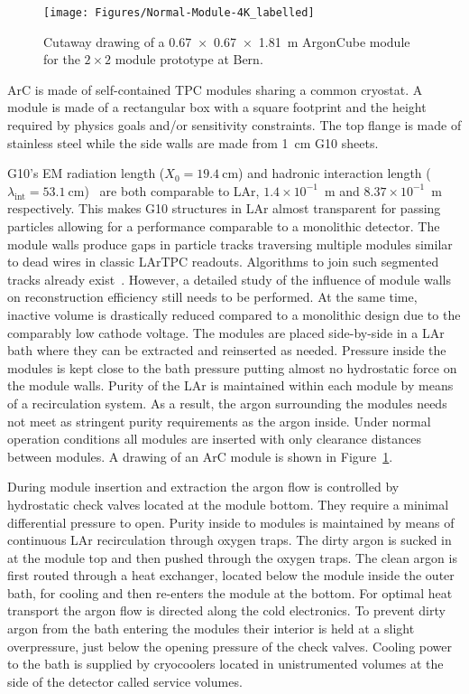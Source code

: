 \documentclass[a4paper]{article}
\newcommand*{\m}{\mathrm}
\begin{document}
\begin{figure}[tbp]
	\centering
	\texttt{[image: Figures/Normal-Module-4K\_labelled]}
	\caption[ArgonCube module engineering drawing]{%
		Cutaway drawing of a \SI{0.67 x 0.67 x 1.81}{\metre} ArgonCube module for the $2\times2$ module prototype at Bern.
	}
	\label{fig:ac_module}
\end{figure}

ArC is made of self-contained TPC modules sharing a common cryostat.
A module is made of a rectangular box with a square footprint and the height required by physics goals and/or sensitivity constraints.
The top flange is made of stainless steel while the side walls are made from \SI{1}{\centi\metre} G10 sheets.

G10's EM radiation length ($X_{\m{0}} = \SI{19.4}{\centi\metre}$) and hadronic interaction length ($\lambda_{\m{int}} = \SI{53.1}{\centi\metre}$)~\cite{pdg_g10} are both comparable to LAr, $1.4\times10^{-1}$~m and $8.37\times10^{-1}$~m respectively.
This makes G10 structures in LAr almost transparent for passing particles allowing for a performance comparable to a monolithic detector.
The module walls produce gaps in particle tracks traversing multiple modules similar to dead wires in classic LArTPC readouts.
Algorithms to join such segmented tracks already exist~\cite{pandora}.
However, a detailed study of the influence of module walls on reconstruction efficiency still needs to be performed.
At the same time, inactive volume is drastically reduced compared to a monolithic design due to the comparably low cathode voltage.
The modules are placed side-by-side in a LAr bath where they can be extracted and reinserted as needed.
Pressure inside the modules is kept close to the bath pressure putting almost no hydrostatic force on the module walls.
Purity of the LAr is maintained within each module by means of a recirculation system.
As a result, the argon surrounding the modules needs not meet as stringent purity requirements as the argon inside.
Under normal operation conditions all modules are inserted with only clearance distances between modules.
A drawing of an ArC module is shown in Figure~\ref{fig:ac_module}.

During module insertion and extraction the argon flow is controlled by hydrostatic check valves located at the module bottom.
They require a minimal differential pressure to open.
Purity inside to modules is maintained by means of continuous LAr recirculation through oxygen traps.
The dirty argon is sucked in at the module top and then pushed through the oxygen traps.
The clean argon is first routed through a heat exchanger, located below the module inside the outer bath, for cooling and then re-enters the module at the bottom.
For optimal heat transport the argon flow is directed along the cold electronics.
To prevent dirty argon from the bath entering the modules their interior is held at a slight overpressure, just below the opening pressure of the check valves.
Cooling power to the bath is supplied by cryocoolers located in unistrumented volumes at the side of the detector called service volumes.
\end{document}

